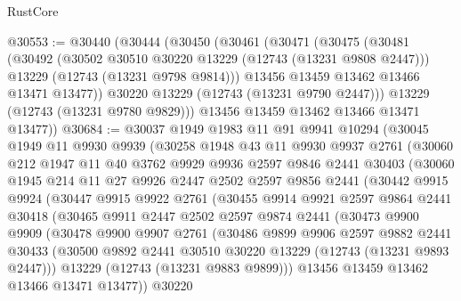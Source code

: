 \begin{lexlean}{RustCore}
\begin{coremodule}
@30553 := @30440
    (@30444
      (@30450
        (@30461
          (@30471
            (@30475
              (@30481
                (@30492
                  (@30502 @30510 @30220 @13229 (@12743 (@13231 @9808 @2447)))
                  @13229
                  (@12743 (@13231 @9798 @9814)))
                @13456
                @13459
                @13462
                @13466
                @13471
                @13477))
            @30220
            @13229
            (@12743 (@13231 @9790 @2447)))
          @13229
          (@12743 (@13231 @9780 @9829)))
        @13456
        @13459
        @13462
        @13466
        @13471
        @13477))
@30684 := @30037
    @1949
    @1983
    @11
    @91
    @9941
    @10294
    (@30045
      @1949
      @11
      @9930
      @9939
      (@30258
        @1948
        @43
        @11
        @9930
        @9937
        @2761
        (@30060
          @212
          @1947
          @11
          @40
          @3762
          @9929
          @9936
          @2597
          @9846
          @2441
          @30403
          (@30060
            @1945
            @214
            @11
            @27
            @9926
            @2447
            @2502
            @2597
            @9856
            @2441
            (@30442
              @9915
              @9924
              (@30447
                @9915
                @9922
                @2761
                (@30455
                  @9914
                  @9921
                  @2597
                  @9864
                  @2441
                  @30418
                  (@30465
                    @9911
                    @2447
                    @2502
                    @2597
                    @9874
                    @2441
                    (@30473
                      @9900
                      @9909
                      (@30478
                        @9900
                        @9907
                        @2761
                        (@30486
                          @9899
                          @9906
                          @2597
                          @9882
                          @2441
                          @30433
                          (@30500 @9892 @2441 @30510 @30220 @13229 (@12743 (@13231 @9893 @2447)))
                          @13229
                          (@12743 (@13231 @9883 @9899)))
                        @13456
                        @13459
                        @13462
                        @13466
                        @13471
                        @13477))
                    @30220

\end{coremodule}
\end{lexlean}
